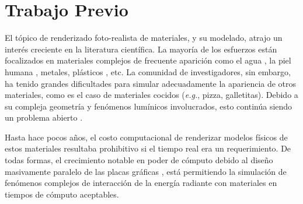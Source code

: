 




\section{Trabajo Previo}
El tópico de renderizado foto-realista de materiales, y su modelado, atrajo un interés creciente en la literatura científica.
La mayoría de los esfuerzos están focalizados en materiales complejos de frecuente aparición como el agua \cite{Schechter2012}, la piel humana \cite{Donner2006}, metales, plásticos \cite{Kurt2010}, etc.
La comunidad de investigadores, sin embargo, ha tenido grandes dificultades para simular adecuadamente la apariencia de otros materiales, como es el caso de materiales cocidos ({\em e.g.}, pizza, galletitas).
Debido a su compleja geometría y fenómenos lumínicos involucrados, esto continúa siendo un problema abierto \cite{Voglsam2013}.

Hasta hace pocos años, el costo computacional de renderizar modelos físicos de estos materiales resultaba prohibitivo si el tiempo real era un requerimiento.
De todas formas, el crecimiento notable en poder de cómputo debido al diseño masivamente paralelo de las placas gráficas \cite{Yeo09,Harris06}, está permitiendo la simulación de fenómenos complejos de interacción de la energía radiante con materiales en tiempos de cómputo aceptables.



